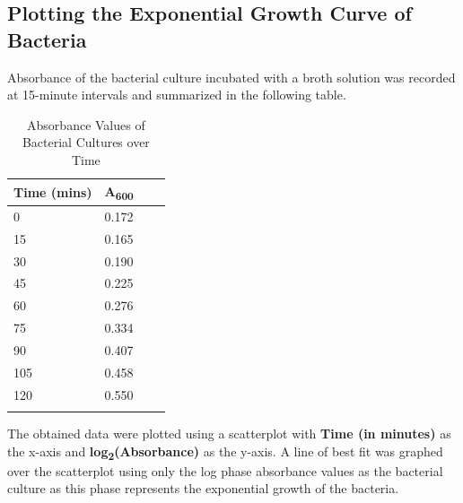 \documentclass[pdflatex,sn-mathphys]{sn-jnl}%
\theoremstyle{thmstyleone}%
\theoremstyle{thmstyletwo}%
\theoremstyle{thmstylethree}%
\begin{document}
\subsection{Plotting the Exponential Growth Curve of Bacteria}
Absorbance of the bacterial culture incubated with a broth solution was
recorded at 15-minute intervals and summarized in the following table.

\begin{table}[h]
  \begin{center}
    \begin{minipage}{174pt}
      \caption{Absorbance Values of Bacterial Cultures over Time}\label{tab:absorbance}%
      \begin{tabular}{@{}llll@{}}
        \toprule
        Time (mins) & A\textsubscript{600} \\
        \midrule
        0           & 0.172                \\
        15          & 0.165                \\
        30          & 0.190                \\
        45          & 0.225                \\
        60          & 0.276                \\
        75          & 0.334                \\
        90          & 0.407                \\
        105         & 0.458                \\
        120         & 0.550                \\
        \botrule
      \end{tabular}
    \end{minipage}
  \end{center}
\end{table}
The obtained data were plotted using a scatterplot with \textbf{Time (in minutes)} as the x-axis and \textbf{log\textsubscript{2}(Absorbance)} as the y-axis. A line of best fit was graphed over the scatterplot using only the log phase absorbance values as the bacterial culture as this phase represents the exponential growth of the bacteria.
\end{document}
